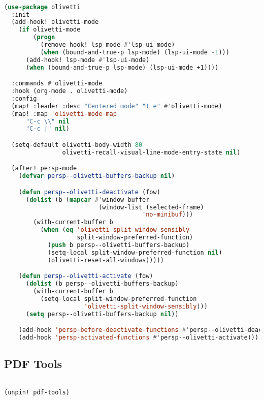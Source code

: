 \documentclass[11pt]{article}
\begin{document}
\begin{lstlisting}[language=Lisp]%! Someone please complete this list for me

(use-package olivetti
  :init
  (add-hook! olivetti-mode
    (if olivetti-mode
        (progn
          (remove-hook! lsp-mode #'lsp-ui-mode)
          (when (bound-and-true-p lsp-mode) (lsp-ui-mode -1)))
      (add-hook! lsp-mode #'lsp-ui-mode)
      (when (bound-and-true-p lsp-mode) (lsp-ui-mode +1))))

  :commands #'olivetti-mode
  :hook (org-mode . olivetti-mode)
  :config
  (map! :leader :desc "Centered mode" "t e" #'olivetti-mode)
  (map! :map 'olivetti-mode-map
      "C-c \\" nil
      "C-c |" nil)

  (setq-default olivetti-body-width 80
                olivetti-recall-visual-line-mode-entry-state nil)

  (after! persp-mode
    (defvar persp--olivetti-buffers-backup nil)

    (defun persp--olivetti-deactivate (fow)
      (dolist (b (mapcar #'window-buffer
                          (window-list (selected-frame)
                                      'no-minibuf)))
        (with-current-buffer b
          (when (eq 'olivetti-split-window-sensibly
                    split-window-preferred-function)
            (push b persp--olivetti-buffers-backup)
            (setq-local split-window-preferred-function nil)
            (olivetti-reset-all-windows)))))

    (defun persp--olivetti-activate (fow)
      (dolist (b persp--olivetti-buffers-backup)
        (with-current-buffer b
          (setq-local split-window-preferred-function
                      'olivetti-split-window-sensibly)))
      (setq persp--olivetti-buffers-backup nil))

    (add-hook 'persp-before-deactivate-functions #'persp--olivetti-deactivate)
    (add-hook 'persp-activated-functions #'persp--olivetti-activate)))
\end{lstlisting}

\subsection{PDF Tools}
\label{sec:pdf-tools}
\begin{lstlisting}[language=Lisp]%! Someone please complete this list for me

(unpin! pdf-tools)
\end{lstlisting}
\end{document}
